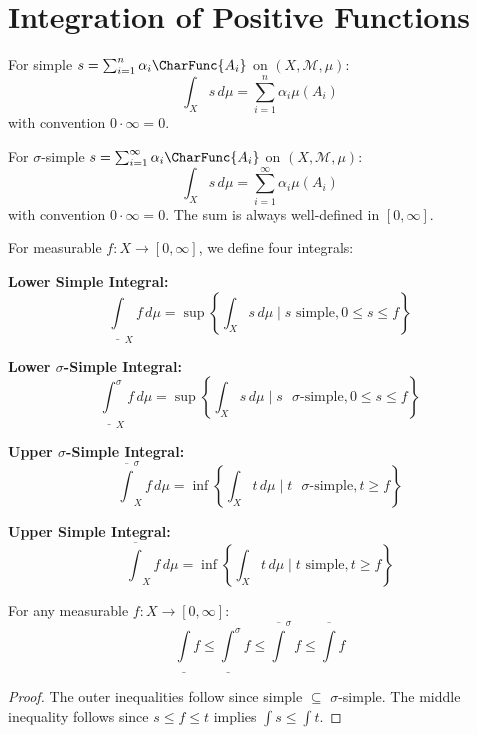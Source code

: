 \section{Integration of Positive Functions}

\begin{definition}
For simple $s = \sum_{i=1}^n \alpha_i \CharFunc{A_i}$ on $(X, \mathcal{M}, \mu)$:
\[ \int_X s \, d\mu = \sum_{i=1}^n \alpha_i \mu(A_i) \]
with convention $0 \cdot \infty = 0$.
\end{definition}

\begin{definition}
For $\sigma$-simple $s = \sum_{i=1}^\infty \alpha_i \CharFunc{A_i}$ on $(X, \mathcal{M}, \mu)$:
\[ \int_X s \, d\mu = \sum_{i=1}^\infty \alpha_i \mu(A_i) \]
with convention $0 \cdot \infty = 0$. The sum is always well-defined in $[0, \infty]$.
\end{definition}

\begin{definition}
For measurable $f: X \to [0, \infty]$, we define four integrals:

\textbf{Lower Simple Integral:}
\[ \underline{\int}_X f \, d\mu = \sup \left\{ \int_X s \, d\mu \mid s \text{ simple}, 0 \leq s \leq f \right\} \]

\textbf{Lower $\sigma$-Simple Integral:}
\[ \underline{\int}^\sigma_X f \, d\mu = \sup \left\{ \int_X s \, d\mu \mid s \text{ $\sigma$-simple}, 0 \leq s \leq f \right\} \]

\textbf{Upper $\sigma$-Simple Integral:}
\[ \overline{\int}^\sigma_X f \, d\mu = \inf \left\{ \int_X t \, d\mu \mid t \text{ $\sigma$-simple}, t \geq f \right\} \]

\textbf{Upper Simple Integral:}
\[ \overline{\int}_X f \, d\mu = \inf \left\{ \int_X t \, d\mu \mid t \text{ simple}, t \geq f \right\} \]
\end{definition}

\begin{proposition}[Ordering]
For any measurable $f: X \to [0, \infty]$:
\[ \underline{\int} f \leq \underline{\int}^\sigma f \leq \overline{\int}^\sigma f \leq \overline{\int} f \]
\end{proposition}

\begin{proof}
The outer inequalities follow since simple $\subseteq$ $\sigma$-simple. The middle inequality follows since $s \leq f \leq t$ implies $\int s \leq \int t$.
\end{proof}

